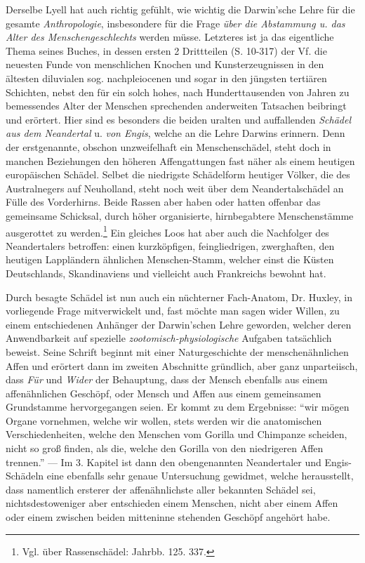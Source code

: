 \documentclass[a4paper, 11pt, oneside, english]{article}
\begin{document}
Derselbe Lyell hat auch richtig gefühlt, wie wichtig die Darwin'sche Lehre für die gesamte \emph{Anthropologie}, insbesondere für die Frage \emph{über die Abstammung u. das Alter des Menschengeschlechts} werden müsse. Letzteres ist ja das eigentliche Thema seines Buches, in dessen ersten 2 Drittteilen (S. 10-317) der Vf. die neuesten Funde von menschlichen Knochen und Kunsterzeugnissen in den ältesten diluvialen sog. nachpleiocenen und sogar in den jüngsten tertiären Schichten, nebst den für ein solch hohes, nach Hunderttausenden von Jahren zu bemessendes Alter der Menschen sprechenden anderweiten Tatsachen beibringt und erörtert. Hier sind es besonders die beiden uralten und auffallenden \emph{Schädel aus dem Neandertal} u. \emph{von Engis}, welche an die Lehre Darwins erinnern. Denn der erstgenannte, obschon unzweifelhaft ein Menschenschädel, steht doch in manchen Beziehungen den höheren Affengattungen fast näher als einem heutigen europäischen Schädel. Selbet die niedrigste Schädelform heutiger Völker, die des Australnegers auf Neuholland, steht noch weit über dem Neandertalschädel an Fülle des Vorderhirns. Beide Rassen aber haben oder hatten offenbar das gemeinsame Schicksal, durch höher organisierte, hirnbegabtere Menschenstämme ausgerottet zu werden.\footnote{Vgl. über Rassenschädel: Jahrbb. 125. 337.} Ein gleiches Loos hat aber auch die Nachfolger des Neandertalers betroffen: einen kurzköpfigen, feingliedrigen, zwerghaften, den heutigen Lappländern ähnlichen Menschen-Stamm, welcher einst die Küsten Deutschlands, Skandinaviens und vielleicht auch Frankreichs bewohnt hat.

Durch besagte Schädel ist nun auch ein nüchterner Fach-Anatom, Dr. Huxley, in vorliegende Frage mitverwickelt und, fast möchte man sagen wider Willen, zu einem entschiedenen Anhänger der Darwin'schen Lehre geworden, welcher deren Anwendbarkeit auf spezielle \emph{zootomisch-physiologische} Aufgaben tatsächlich beweist. Seine Schrift beginnt mit einer Naturgeschichte der menschenähnlichen Affen und erörtert dann im zweiten Abschnitte gründlich, aber ganz unparteiisch, dass \emph{Für} und \emph{Wider} der Behauptung, dass der Mensch ebenfalls aus einem affenähnlichen Geschöpf, oder Mensch und Affen aus einem gemeinsamen Grundstamme hervorgegangen seien. Er kommt zu dem Ergebnisse: "`wir mögen Organe vornehmen, welche wir wollen, stets werden wir die anatomischen Verschiedenheiten, welche den Menschen vom Gorilla und Chimpanze scheiden, nicht so groß finden, als die, welche den Gorilla von den niedrigeren Affen trennen."' --- Im 3. Kapitel ist dann den obengenannten Neandertaler und Engis-Schädeln eine ebenfalls sehr genaue Untersuchung gewidmet, welche herausstellt, dass namentlich ersterer der affenähnlichste aller bekannten Schädel sei, nichtsdestoweniger aber entschieden einem Menschen, nicht aber einem Affen oder einem zwischen beiden mitteninne stehenden Geschöpf angehört habe.
\end{document}
